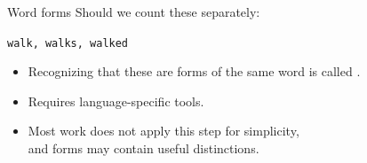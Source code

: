 \documentclass[aspectratio=169,usenames,dvipsnames]{beamer}
\begin{document}
\begin{frame}{Word forms}
    Should we count these separately:

    \vspace{1em}
    \texttt{walk, walks, walked}

    \vspace{1em}
    \begin{itemize}
    \item Recognizing that these are forms of the same word
    is called .

    \item Requires language-specific tools.

    \item Most work does not apply this step for simplicity,\\
        and forms may contain useful distinctions.
    \end{itemize}
\end{frame}

%
%
%
\end{document}
